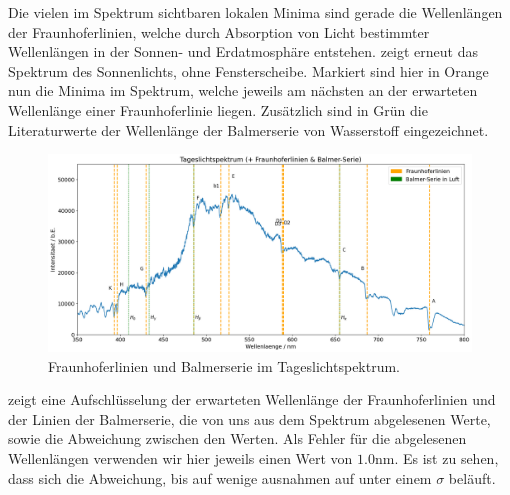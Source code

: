 Die vielen im Spektrum sichtbaren lokalen Minima sind gerade die Wellenlängen der Fraunhoferlinien, welche durch Absorption von Licht bestimmter Wellenlängen in der Sonnen- und Erdatmosphäre entstehen.  zeigt erneut das Spektrum des Sonnenlichts, ohne Fensterscheibe. Markiert sind hier in Orange nun die Minima im Spektrum, welche jeweils am nächsten an der erwarteten Wellenlänge einer Fraunhoferlinie liegen. Zusätzlich sind in Grün die Literaturwerte der Wellenlänge der Balmerserie von Wasserstoff eingezeichnet.

\begin{figure}[H]
  \centering
  \includegraphics[width=\textwidth]{files/plots/spektrum_fraunhofer_balmer.png}
  \caption{Fraunhoferlinien und Balmerserie im Tageslichtspektrum.}
  \label{fig:spektrum_fraunhofer_balmer}
\end{figure}

 zeigt eine Aufschlüsselung der erwarteten Wellenlänge der Fraunhoferlinien und der Linien der Balmerserie, die von uns aus dem Spektrum abgelesenen Werte, sowie die Abweichung zwischen den Werten. Als Fehler für die abgelesenen Wellenlängen verwenden wir hier jeweils einen Wert von $1.0 \si{\nano\meter}$. Es ist zu sehen, dass sich die Abweichung, bis auf wenige ausnahmen auf unter einem $\sigma$ beläuft.

